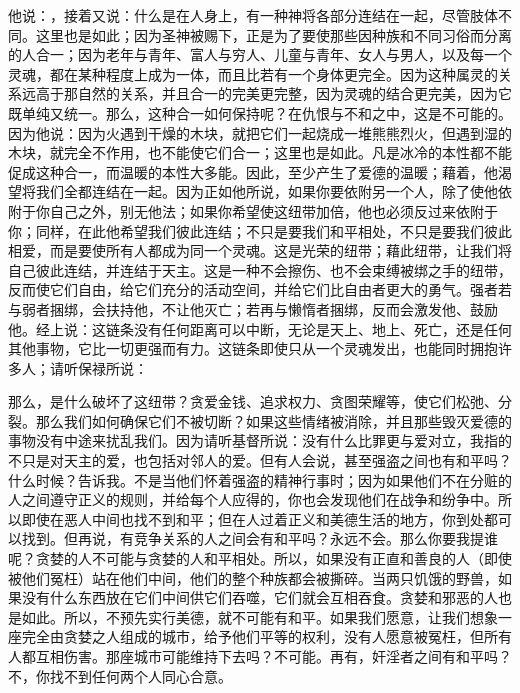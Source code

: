 他说：，接着又说：什么是在人身上，有一种神将各部分连结在一起，尽管肢体不同。这里也是如此；因为圣神被赐下，正是为了要使那些因种族和不同习俗而分离的人合一；因为老年与青年、富人与穷人、儿童与青年、女人与男人，以及每一个灵魂，都在某种程度上成为一体，而且比若有一个身体更完全。因为这种属灵的关系远高于那自然的关系，并且合一的完美更完整，因为灵魂的结合更完美，因为它既单纯又统一。那么，这种合一如何保持呢？在仇恨与不和之中，这是不可能的。因为他说：因为火遇到干燥的木块，就把它们一起烧成一堆熊熊烈火，但遇到湿的木块，就完全不作用，也不能使它们合一；这里也是如此。凡是冰冷的本性都不能促成这种合一，而温暖的本性大多能。因此，至少产生了爱德的温暖；藉着，他渴望将我们全都连结在一起。因为正如他所说，如果你要依附另一个人，除了使他依附于你自己之外，别无他法；如果你希望使这纽带加倍，他也必须反过来依附于你；同样，在此他希望我们彼此连结；不只是要我们和平相处，不只是要我们彼此相爱，而是要使所有人都成为同一个灵魂。这是光荣的纽带；藉此纽带，让我们将自己彼此连结，并连结于天主。这是一种不会擦伤、也不会束缚被绑之手的纽带，反而使它们自由，给它们充分的活动空间，并给它们比自由者更大的勇气。强者若与弱者捆绑，会扶持他，不让他灭亡；若再与懒惰者捆绑，反而会激发他、鼓励他。经上说：这链条没有任何距离可以中断，无论是天上、地上、死亡，还是任何其他事物，它比一切更强而有力。这链条即使只从一个灵魂发出，也能同时拥抱许多人；请听保禄所说：\par

那么，是什么破坏了这纽带？贪爱金钱、追求权力、贪图荣耀等，使它们松弛、分裂。那么我们如何确保它们不被切断？如果这些情绪被消除，并且那些毁灭爱德的事物没有中途来扰乱我们。因为请听基督所说：没有什么比罪更与爱对立，我指的不只是对天主的爱，也包括对邻人的爱。但有人会说，甚至强盗之间也有和平吗？什么时候？告诉我。不是当他们怀着强盗的精神行事时；因为如果他们不在分赃的人之间遵守正义的规则，并给每个人应得的，你也会发现他们在战争和纷争中。所以即使在恶人中间也找不到和平；但在人过着正义和美德生活的地方，你到处都可以找到。但再说，有竞争关系的人之间会有和平吗？永远不会。那么你要我提谁呢？贪婪的人不可能与贪婪的人和平相处。所以，如果没有正直和善良的人（即使被他们冤枉）站在他们中间，他们的整个种族都会被撕碎。当两只饥饿的野兽，如果没有什么东西放在它们中间供它们吞噬，它们就会互相吞食。贪婪和邪恶的人也是如此。所以，不预先实行美德，就不可能有和平。如果我们愿意，让我们想象一座完全由贪婪之人组成的城市，给予他们平等的权利，没有人愿意被冤枉，但所有人都互相伤害。那座城市可能维持下去吗？不可能。再有，奸淫者之间有和平吗？不，你找不到任何两个人同心合意。\par

